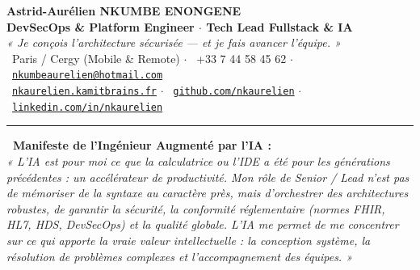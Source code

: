\documentclass[10pt,a4paper]{article}
\begin{document}
\begin{center}
    {\LARGE\bfseries\color{brandTeal} Astrid-Aurélien NKUMBE ENONGENE}\\[0.3em]
    {\large\bfseries\color{darkgray} DevSecOps \& Platform Engineer $\cdot$ Tech Lead Fullstack \& IA}\\[0.35em]
    {\normalsize\color{slateGray}\itshape « Je conçois l'architecture sécurisée --- et je fais avancer l'équipe. »}\\[0.5em]
    {\footnotesize\color{slateGray}
        \faMapMarker*\ Paris / Cergy (Mobile \& Remote) \quad$\cdot$\quad
        \faPhone*\ +33 7 44 58 45 62 \quad$\cdot$\quad
        \faEnvelope\ \href{mailto:nkumbeaurelien@hotmail.com}{\texttt{nkumbeaurelien@hotmail.com}}\\[0.25em]
        \faGlobe\ \href{https://nkaurelien.kamitbrains.fr}{\texttt{nkaurelien.kamitbrains.fr}} \quad$\cdot$\quad
        \faGithub\ \href{https://github.com/nkaurelien}{\texttt{github.com/nkaurelien}} \quad$\cdot$\quad
        \faLinkedin\ \href{https://www.linkedin.com/in/nkaurelien/}{\texttt{linkedin.com/in/nkaurelien}}
    }
\end{center}

\vspace{0.1em}
\textcolor{ruleGray}{\rule{\linewidth}{1pt}}
\vspace{0.4em}

\begin{tcolorbox}[
    colback=brandTealLight,
    colframe=brandTealBorder,
    arc=4pt,
    boxrule=0.8pt,
    top=5pt,bottom=5pt,left=8pt,right=8pt
]
\textbf{\color{brandTeal}\faLightbulb\ Manifeste de l'Ingénieur Augmenté par l'IA :}\\
{\small\itshape
« L'IA est pour moi ce que la calculatrice ou l'IDE a été pour les générations précédentes : un accélérateur de productivité. Mon rôle de Senior / Lead n'est pas de mémoriser de la syntaxe au caractère près, mais d'orchestrer des architectures robustes, de garantir la sécurité, la conformité réglementaire (normes FHIR, HL7, HDS, DevSecOps) et la qualité globale. L'IA me permet de me concentrer sur ce qui apporte la vraie valeur intellectuelle : la conception système, la résolution de problèmes complexes et l'accompagnement des équipes. »
}
\end{tcolorbox}
\end{document}
